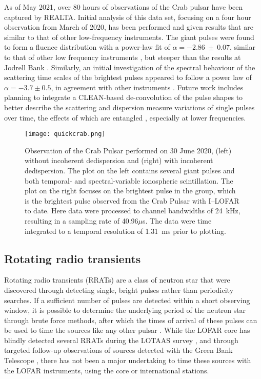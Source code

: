 As of May 2021, over 80 hours of observations of the Crab pulsar have been captured by REALTA. Initial analysis of this data set, focusing on a four hour observation from March of 2020, has been performed and given results that are similar to that of other low-frequency instruments. The giant pulses were found to form a fluence distribution with a power-law fit of $\alpha = -2.86~\pm~0.07$, similar to that of other low frequency instruments \citep{Meyers2017}, but steeper than the results at Jodrell Bank \citep{Mickaliger2017}. Similarly, an initial investigation of the spectral behaviour of the scattering time scales of the brightest pulses appeared to follow a power law of $\alpha = -3.7 \pm 0.5$, in agreement with other instruments \citep{Driessen2019}. Future work includes planning to integrate a CLEAN-based de-convolution \citep[see][]{Bhat2003} of the pulse shapes to better describe the scattering and dispersion measure variations of single pulses over time, the effects of which are entangled \citep{McKee2018}, especially at lower frequencies.

\begin{figure}
    \centering
    \texttt{[image: quickcrab.png]}
    \caption[Observation of the Crab Pulsar performed on 30 June 2020.]{Observation of the Crab Pulsar performed on 30 June 2020, (left) without incoherent dedispersion and (right) with incoherent dedispersion. The plot on the left contains several giant pulses and both temporal- and spectral-variable ionospheric scintillation.  The plot on the right focuses on the brightest pulse in the group, which is the brightest pulse observed from the Crab Pulsar with I--LOFAR to date. Here data were processed to channel bandwidths of 24~kHz, resulting in a sampling rate of 40.96$\mu$s. The data were time integrated to a temporal resolution of 1.31~ms prior to plotting.}
    \label{fig:giant_pulse}
\end{figure}

\subsection{Rotating radio transients}\label{sec:rratsurvey}
Rotating radio transients (RRATs) are a class of neutron star that were discovered through detecting single, bright pulses rather than periodicity searches. If a sufficient number of pulses are detected within a short observing window, it is possible to determine the underlying period of the neutron star through brute force methods, after which the times of arrival of these pulses can be used to time the sources like any other pulsar \citep{Keane2011}. While the LOFAR core has blindly detected several RRATs during the LOTAAS survey \citep{Sanidas2019, Michilli2020, Tan2020}, and through targeted follow-up observations of sources detected with the Green Bank Telescope \citep{Karako-Argaman2015}, there has not been a major undertaking to time these sources with the LOFAR instruments, using the core or international stations.

